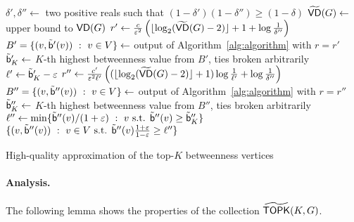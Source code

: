 \begin{algorithm}[ht]
   \DontPrintSemicolon
  $\delta',\delta''\leftarrow$ two positive reals such that
  $(1-\delta')(1-\delta'')\ge(1-\delta)$\;
  $\widetilde{\mathsf{VD}}(G)\leftarrow$ upper bound to $\mathsf{VD}(G)$\;
  $r'\leftarrow\frac{c}{\varepsilon^2}\left(\lfloor\log_2(\widetilde{\mathsf{VD}}(G)-2)\rfloor+1+\log\frac{1}{\delta''}\right)$\;
  $B'=\{(v,\tilde{\mathsf{b}}'(v)) ~:~ v\in V\}\leftarrow$ output of Algorithm~\ref{alg:algorithm} with $r=r'$\;
  $\tilde{\mathsf{b}}_K'\leftarrow$ $K$-th highest betweenness value from $B'$, ties
  broken arbitrarily\;
  $\ell'\leftarrow\tilde{\mathsf{b}}_K'-\varepsilon$\;
  $r''\leftarrow\frac{c'}{\varepsilon^2\ell'}\left((\lfloor\log_2(\widetilde{\mathsf{VD}}(G)-2)\rfloor+1)\log\frac{1}{\ell'}+\log\frac{1}{\delta''}\right)$\;
  $B''=\{(v,\tilde{\mathsf{b}}''(v)) ~:~ v\in V\}\leftarrow$ output of
  Algorithm~\ref{alg:algorithm} with $r=r''$\;
  $\tilde{\mathsf{b}}_K''\leftarrow$ $K$-th highest betweenness value from $B''$, ties
  broken arbitrarily\;
  $\ell''\leftarrow\min\{\tilde{\mathsf{b}}''(v)/(1+\varepsilon) ~:~ v \mbox{ s.t. }
  \tilde{\mathsf{b}}''(v)\ge\tilde{\mathsf{b}}_K''\}$\;
  \Return $\{(v,\tilde{\mathsf{b}}''(v)) ~:~ v\in V \mbox{ s.t. }
  \tilde{\mathsf{b}}''(v)\frac{1+\varepsilon}{1-\varepsilon}\ge\ell''\}$\;
  \caption{High-quality approximation of the top-$K$ betweenness vertices}
  \label{alg:topk}
\end{algorithm}

\paragraph{Analysis.}
The following lemma shows the properties of the collection $\widetilde{\mathsf{TOPK}}(K,G)$.
\fi

